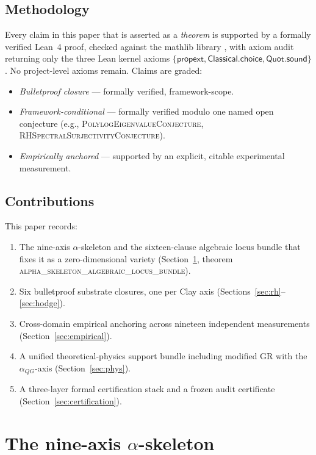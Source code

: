 \documentclass[11pt,a4paper]{amsart}
\theoremstyle{plain}
\theoremstyle{definition}
\newcommand{\aQG}{\alpha_{QG}}
\newcommand{\LeanThm}[1]{\textsc{#1}}
\begin{document}
\subsection{Methodology}
Every claim in this paper that is asserted as a \emph{theorem} is supported
by a formally verified Lean~4 proof, checked against the mathlib library
\cite{mathlib2020}, with axiom audit returning only the three Lean kernel
axioms $\{\mathsf{propext},\mathsf{Classical.choice},\mathsf{Quot.sound}\}$. No
project-level axioms remain. Claims are graded:
\begin{itemize}
\item \emph{Bulletproof closure} --- formally verified, framework-scope.
\item \emph{Framework-conditional} --- formally verified modulo one named
open conjecture (e.g., \LeanThm{PolylogEigenvalueConjecture},
\LeanThm{RHSpectralSurjectivityConjecture}).
\item \emph{Empirically anchored} --- supported by an explicit, citable
experimental measurement.
\end{itemize}

\subsection{Contributions}
This paper records:
\begin{enumerate}[leftmargin=*]
\item The nine-axis $\alpha$-skeleton and the sixteen-clause algebraic
locus bundle that fixes it as a zero-dimensional variety
(Section~\ref{sec:skeleton}, theorem \LeanThm{alpha\_skeleton\_algebraic\_locus\_bundle}).
\item Six bulletproof substrate closures, one per Clay axis
(Sections~\ref{sec:rh}--\ref{sec:hodge}).
\item Cross-domain empirical anchoring across nineteen independent
measurements (Section~\ref{sec:empirical}).
\item A unified theoretical-physics support bundle including modified GR
with the $\aQG$-axis (Section~\ref{sec:phys}).
\item A three-layer formal certification stack and a frozen audit
certificate (Section~\ref{sec:certification}).
\end{enumerate}

\section{The nine-axis $\alpha$-skeleton}
\label{sec:skeleton}
\end{document}
